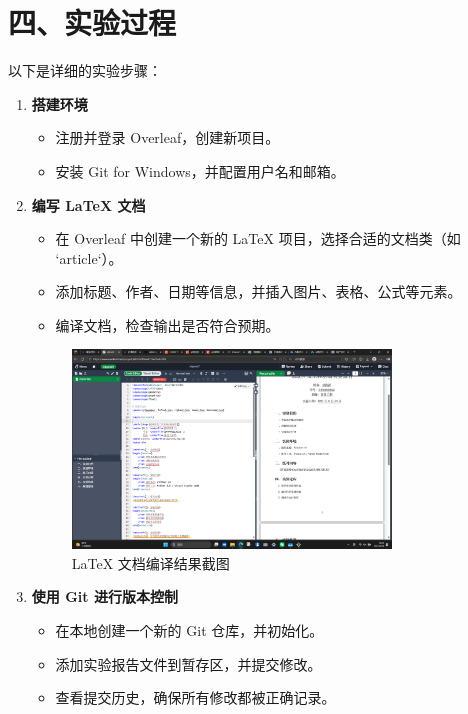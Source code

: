 \documentclass[a4paper, 12pt]{article}
\begin{document}
\section*{四、实验过程}
以下是详细的实验步骤：

\begin{enumerate}
    \item \textbf{搭建环境}
    \begin{itemize}
        \item 注册并登录 Overleaf，创建新项目。
        \item 安装 Git for Windows，并配置用户名和邮箱。
    \end{itemize}

    \item \textbf{编写 LaTeX 文档}
    \begin{itemize}
        \item 在 Overleaf 中创建一个新的 LaTeX 项目，选择合适的文档类（如 `article`）。
        \item 添加标题、作者、日期等信息，并插入图片、表格、公式等元素。
        \item 编译文档，检查输出是否符合预期。
    \end{itemize}

    \begin{figure}[htbp]
        \centering
        \includegraphics[width=0.8\textwidth]{latex.png}%
        \caption{LaTeX 文档编译结果截图}
        \label{fig:latex}
    \end{figure}

    \item \textbf{使用 Git 进行版本控制}
    \begin{itemize}
        \item 在本地创建一个新的 Git 仓库，并初始化。
        \item 添加实验报告文件到暂存区，并提交修改。
        \item 查看提交历史，确保所有修改都被正确记录。
    \end{itemize}


\end{enumerate}
\end{document}
